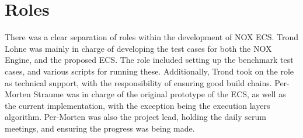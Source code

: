 \section{Roles}
There was a clear separation of roles within the development of NOX ECS.
Trond Lohne was mainly in charge of developing the test cases for both the NOX Engine,
and the proposed ECS.
The role included setting up the benchmark test cases, and various scripts for running these.
Additionally, Trond took on the role as technical support, with the responsibility of ensuring
good build chains.
Per-Morten Straume was in charge of the original prototype of the ECS, as well as the current implementation,
with the exception being the execution layers algorithm.
Per-Morten was also the project lead, holding the daily scrum meetings, and ensuring the progress was being made.
